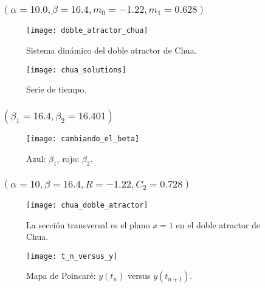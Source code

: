 \begin{frame}
	\frametitle{\secname\quad$\left(\alpha=10.0, \beta=16.4, m_{0}=-1.22, m_{1}=0.628\right)$}

	\begin{minipage}{0.45\textwidth}
		\begin{figure}[ht!]
			\centering
			\texttt{[image: doble\_atractor\_chua]}
			\caption{Sistema dinámico del doble atractor de Chua.}\label{fig:doble_atractor_chua}
		\end{figure}
	\end{minipage}
	\begin{minipage}{0.45\textwidth}
		\begin{figure}[ht!]
			\centering
			\texttt{[image: chua\_solutions]}
			\caption{Serie de tiempo.}\label{fig:chua_solutions}
		\end{figure}
	\end{minipage}
\end{frame}

\begin{frame}
	\frametitle{\secname\quad$\left(\beta_{1}=16.4,\beta_{2}=16.401\right)$}

	\begin{figure}[ht!]
		\centering
		\texttt{[image: cambiando\_el\_beta]}
		\caption{Azul: $\beta_{1}$, rojo: $\beta_{2}$.}\label{fig:lyapunov}
	\end{figure}

\end{frame}

\begin{frame}
	\frametitle{\secname\quad$\left(\alpha=10,\beta=16.4,R=-1.22,C_{2}=0.728\right)$}

	\begin{minipage}{0.45\textwidth}
		\begin{figure}[ht!]
			\centering
			\texttt{[image: chua\_doble\_atractor]}
			\caption{La sección transversal es el plano $x=1$ en el doble atractor de Chua.}\label{fig:chua_doble_atractor}
		\end{figure}
	\end{minipage}
	\begin{minipage}{0.45\textwidth}
		\begin{figure}[ht!]
			\centering
			\texttt{[image: t\_n\_versus\_y]}
			\caption{Mapa de Poincaré: $y\left(t_{n}\right)$ versus $y\left(t_{n+1}\right)$.}\label{fig:chua_solutions}
		\end{figure}
	\end{minipage}
\end{frame}

